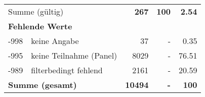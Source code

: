\begin{longtable}{lXrrr}
     \midrule
     \multicolumn{2}{l}{Summe (gültig)} &
       \textbf{\num{267}} &
     \textbf{100} &
       \textbf{\num[round-mode=places,round-precision=2]{2,54}} \\
     \multicolumn{5}{l}{\textbf{Fehlende Werte}}\\
       -998 &
       keine Angabe &
         \num{37} &
        - &
         \num[round-mode=places,round-precision=2]{0,35} \\
       -995 &
       keine Teilnahme (Panel) &
         \num{8029} &
        - &
         \num[round-mode=places,round-precision=2]{76,51} \\
       -989 &
       filterbedingt fehlend &
         \num{2161} &
        - &
         \num[round-mode=places,round-precision=2]{20,59} \\
     \midrule
     \multicolumn{2}{l}{\textbf{Summe (gesamt)}} &
          \textbf{\num{10494}} &
        \textbf{-} &
        \textbf{100} \\
     \bottomrule
     \end{longtable}
     
